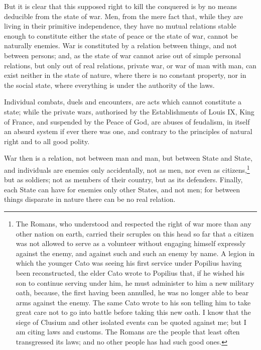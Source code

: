 \documentclass[12pt]{book}
\begin{document}
But it is clear that this supposed right to kill the conquered is by no means deducible from the state of war. Men, from the mere fact that, while they are living in their primitive independence, they have no mutual relations stable enough to constitute either the state of peace or the state of war, cannot be naturally enemies. War is constituted by a relation between things, and not between persons; and, as the state of war cannot arise out of simple personal relations, but only out of real relations, private war, or war of man with man, can exist neither in the state of nature, where there is no constant property, nor in the social state, where everything is under the authority of the laws.

Individual combats, duels and encounters, are acts which cannot constitute a state; while the private wars, authorised by the Establishments of Louis IX, King of France, and suspended by the Peace of God, are abuses of feudalism, in itself an absurd system if ever there was one, and contrary to the principles of natural right and to all good polity.

War then is a relation, not between man and man, but between State and State, and individuals are enemies only accidentally, not as men, nor even as citizens,\footnote{The Romans, who understood and respected the right of war more than any other nation on earth, carried their scruples on this head so far that a citizen was not allowed to serve as a volunteer without engaging himself expressly against the enemy, and against such and such an enemy by name. A legion in which the younger Cato was seeing his first service under Popilius having been reconstructed, the elder Cato wrote to Popilius that, if he wished his son to continue serving under him, he must administer to him a new military oath, because, the first having been annulled, he was no longer able to bear arms against the enemy. The same Cato wrote to his son telling him to take great care not to go into battle before taking this new oath. I know that the siege of Clusium and other isolated events can be quoted against me; but I am citing laws and customs. The Romans are the people that least often transgressed its laws; and no other people has had such good ones.} but as soldiers; not as members of their country, but as its defenders. Finally, each State can have for enemies only other States, and not men; for between things disparate in nature there can be no real relation.
\end{document}
